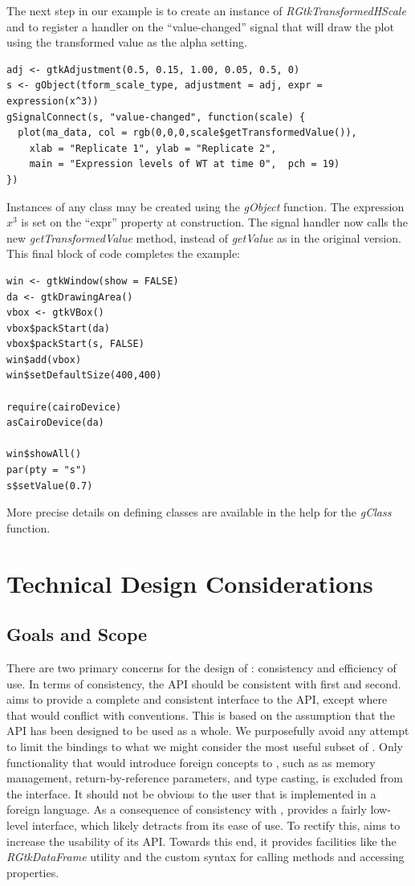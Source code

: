 \documentclass[article]{jss}
\begin{document}
The next step in our example is to create an instance
of \emph{RGtkTransformedHScale} and to register a handler on the 
``value-changed'' signal that will draw the plot using the transformed value as 
the alpha setting.
\begin{verbatim}
adj <- gtkAdjustment(0.5, 0.15, 1.00, 0.05, 0.5, 0)
s <- gObject(tform_scale_type, adjustment = adj, expr = expression(x^3))
gSignalConnect(s, "value-changed", function(scale) {
  plot(ma_data, col = rgb(0,0,0,scale$getTransformedValue()),
    xlab = "Replicate 1", ylab = "Replicate 2", 
    main = "Expression levels of WT at time 0",  pch = 19)
})
\end{verbatim}
Instances of any  class may be created using the \emph{gObject} function.
The expression $x^3$ is set on the ``expr'' property at construction. The
signal handler now calls the new \emph{getTransformedValue} method, instead
of \emph{getValue} as in the original version. This final block of code
completes the example:
\begin{verbatim}
win <- gtkWindow(show = FALSE)
da <- gtkDrawingArea()
vbox <- gtkVBox()
vbox$packStart(da)
vbox$packStart(s, FALSE)
win$add(vbox)
win$setDefaultSize(400,400)

require(cairoDevice)
asCairoDevice(da)

win$showAll()
par(pty = "s")
s$setValue(0.7)
\end{verbatim}

More precise details on defining  classes are available in the 
 help for the \emph{gClass} function.

\section{Technical Design Considerations}

\subsection{Goals and Scope}

There are two primary concerns for the design of : consistency
and efficiency of use. In terms of consistency, the API should be consistent 
with  first and  second.  aims to provide a 
complete and consistent interface to the  API, except where that would
conflict with  conventions. This is based on the assumption that the
 API has been designed to be used as a whole. We purposefully avoid 
any attempt to limit the bindings to what we might consider the most useful 
subset of . Only functionality that would introduce foreign concepts
to , such as as memory management, return-by-reference parameters, 
and type casting, is excluded from the  interface. It should not be
obvious to the user that  is implemented in a foreign language.
As a consequence of consistency with ,  provides a fairly 
low-level interface, which likely detracts from its ease of use. To rectify
this,  aims to increase the usability of its API. 
Towards this end, it provides facilities like the \emph{RGtkDataFrame} utility 
and the custom syntax for calling methods and accessing properties. 
\end{document}
